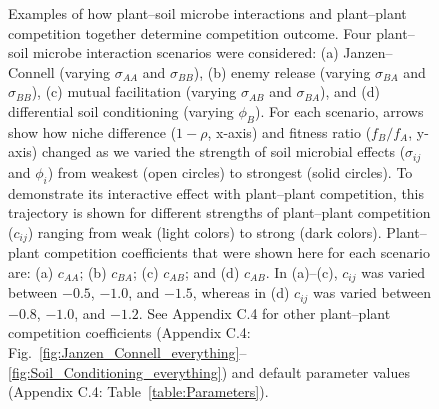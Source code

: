 \clearpage
\begin{figure}[h!]
	\centering
	\caption[Examples of how plant--soil microbe interactions and plant--plant competition together determine competition outcome.]
		{\hspace{1mm}Examples of how plant--soil microbe interactions and plant--plant competition together determine competition outcome. Four plant--soil microbe interaction scenarios were considered: (a) Janzen--Connell (varying $\sigma_{AA}$ and $\sigma_{BB}$), (b) enemy release (varying $\sigma_{BA}$ and $\sigma_{BB}$), (c) mutual facilitation (varying $\sigma_{AB}$ and  $\sigma_{BA}$), and (d) differential soil conditioning (varying $\phi_{B}$). For each scenario, arrows show how niche difference ($1 - \rho$, x-axis) and fitness ratio ($f_{B}/f_{A}$, y-axis) changed as we varied the strength of soil microbial effects ($\sigma_{ij}$ and $\phi_{i}$) from weakest (open circles) to strongest (solid circles). To demonstrate its interactive effect with plant--plant competition, this trajectory is shown for different strengths of plant--plant competition ($c_{ij}$) ranging from weak (light colors) to strong (dark colors). Plant--plant competition coefficients that were shown here for each scenario are: (a) $c_{AA}$; (b) $c_{BA}$; (c) $c_{AB}$; and (d) $c_{AB}$. In (a)--(c), $c_{ij}$ was varied between $-0.5$, $-1.0$, and $-1.5$, whereas in (d) $c_{ij}$ was varied between $-0.8$, $-1.0$, and $-1.2$. See Appendix C.4 for other plant--plant competition coefficients (Appendix C.4: Fig.~\ref{fig:Janzen_Connell_everything}--\ref{fig:Soil_Conditioning_everything}) and default parameter values (Appendix C.4: Table~\ref{table:Parameters}).}
	\label{fig:Scenario_Battleaxes}
\end{figure}



